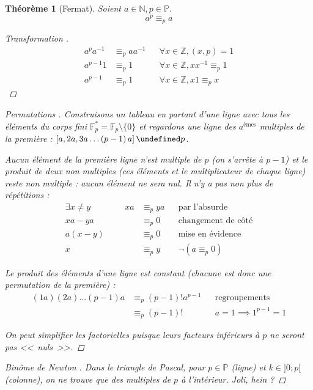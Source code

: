 \documentclass[11pt,twocolumn]{article}
\let\mod\undefined
\DeclareMathOperator{\mod}{mod}
\theoremstyle{plain}
\newtheorem{thm}{Théorème}
\newcommand{\esP}{\mathbb{P}} %
\newcommand{\esN}{\mathbb{N}} %
\newcommand{\esZ}{\mathbb{Z}} %
\newcommand{\esF}{\mathbb{F}} %
\begin{document}
\begin{thm}[Fermat]\label{thm:fermat}
	Soient $a \in \esN, p \in \esP$. \[
		a^p \equiv_p a
	\]
	\begin{proof}[Transformation \cite{Gillis}]
		\begin{align*}
			a^pa^{-1} & \equiv_p aa^{-1} && \forall x \in \esZ, (x,p)=1 \\
			a^{p-1}1 & \equiv_p 1 && \forall x \in \esZ, xx^{-1} \equiv_p 1 \\
			a^{p-1} & \equiv_p 1 && \forall x \in \esZ, x1 \equiv_p x
		\end{align*}
	\end{proof}
	\begin{proof}[Permutations \cite{Buys}]
		Construisons un tableau en partant d'une ligne avec tous les éléments
		du corps fini $\esF_p^* = \esF_p \setminus \{0\}$ et regardons une
		ligne des $a^{\text{èmes}}$ multiples de la première :
		$\left[a, 2a, 3a \dots \left(p-1\right)a\right] \mod p$.

		Aucun élément de la première ligne n'est multiple de $p$ (on s'arrête à
		$p-1$) et le produit de deux non multiples (ces éléments et le
		multiplicateur de chaque ligne) reste non multiple : aucun élément ne
		sera nul. Il n'y a pas non plus de répétitions :
		\begin{align*}
			\exists x \neq y \qquad\qquad
			xa & \equiv_p ya && \text{par l'absurde} \\
			xa - ya & \equiv_p 0 && \text{changement de côté} \\
			a \left(x - y\right) & \equiv_p 0 && \text{mise en évidence} \\
			x & \equiv_p y && \lnot \left(a \equiv_p 0\right)
		\end{align*}

		Le produit des éléments d'une ligne est constant (chacune est donc une
		permutation de la première) :
		\begin{align*}
			(1a)(2a)\dots\left(p-1\right)a
			& \equiv_p \left(p-1\right)!a^{p-1} && \text{regroupements} \\
			& \equiv_p \left(p-1\right)! && a=1 \implies 1^{p-1} = 1
		\end{align*}

		On peut simplifier les factorielles puisque
		leurs facteurs inférieurs à $p$ ne seront pas <<~nuls~>>.
	\end{proof}
	\begin{proof}[Binôme de Newton \cite{Buys}]
		Dans le triangle de Pascal, pour $p \in \esP$ (ligne) et
		$k \in ]0;p[$ (colonne), on ne trouve que des multiples de $p$
		à l'intérieur. \emph{Joli, hein ?}


\end{proof}
\end{thm}
\end{document}
